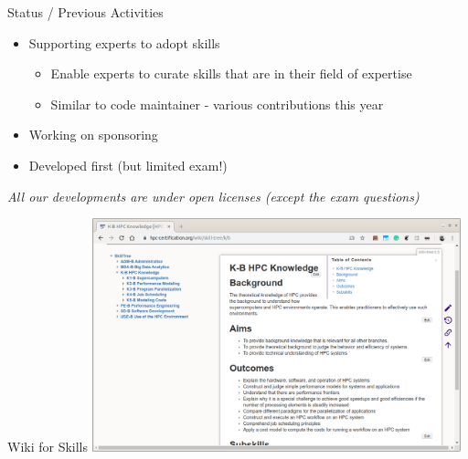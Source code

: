 \documentclass[compress,aspectratio=169]{beamer}
\begin{document}
\begin{frame}{Status / Previous Activities}
\vspace*{-1cm}

\begin{block}{}
\begin{itemize}
\item Supporting experts to adopt skills
\begin{itemize}
  \item Enable experts to curate skills that are in their field of expertise
  \item Similar to code maintainer - various contributions this year
\end{itemize}
\item Working on sponsoring 
\item Developed first (but limited exam!)
\end{itemize}
\end{block}

\medskip

\textit{All our developments are under open licenses (except the exam questions)}
\end{frame}


\begin{frame}{Wiki for Skills}
  \includegraphics[width=0.8\textwidth]{www}
\end{frame}
\end{document}
